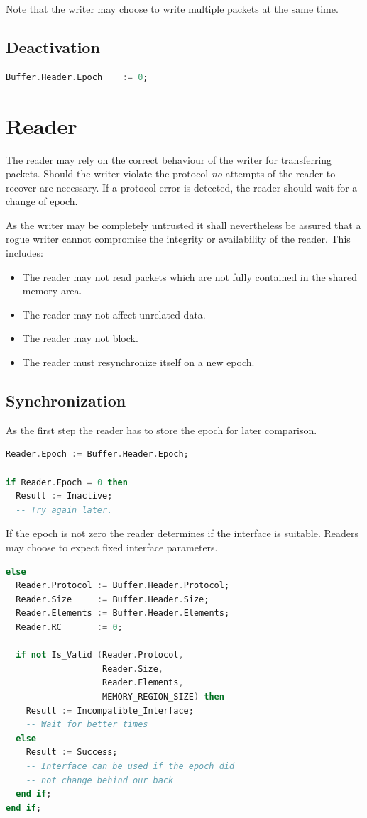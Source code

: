 \documentclass[a4paper,twoside,titlepage]{article}
\begin{document}
Note that the writer may choose to write multiple packets at the same time.

\subsection{Deactivation}

\begin{lstlisting}[language=Ada]
Buffer.Header.Epoch    := 0;
\end{lstlisting}

\section{Reader}

The reader may rely on the correct behaviour of the writer for transferring packets.
Should the writer violate the protocol \emph{no} attempts of the reader to recover are
necessary. If a protocol error is detected, the reader should wait for a change of epoch.

As the writer may be completely untrusted it shall nevertheless be assured that a rogue writer
cannot compromise the integrity or availability of the reader. This includes:
\begin{itemize}
\item The reader may not read packets which are not fully contained in the shared memory area.
\item The reader may not affect unrelated data.
\item The reader may not block.
\item The reader must resynchronize itself on a new epoch.
\end{itemize}

\subsection{Synchronization}

As the first step the reader has to store the epoch for later comparison.
\begin{lstlisting}[language=Ada]
Reader.Epoch := Buffer.Header.Epoch;

if Reader.Epoch = 0 then
  Result := Inactive;
  -- Try again later.
\end{lstlisting}

If the epoch is not zero the reader determines if the interface is suitable.
Readers may choose to expect fixed interface parameters.

\begin{lstlisting}[firstnumber=last,language=Ada]
else
  Reader.Protocol := Buffer.Header.Protocol;
  Reader.Size     := Buffer.Header.Size;
  Reader.Elements := Buffer.Header.Elements;
  Reader.RC       := 0;

  if not Is_Valid (Reader.Protocol,
                   Reader.Size,
                   Reader.Elements,
                   MEMORY_REGION_SIZE) then
    Result := Incompatible_Interface;
    -- Wait for better times
  else
    Result := Success;
    -- Interface can be used if the epoch did
    -- not change behind our back
  end if;
end if;
\end{lstlisting}
\end{document}
